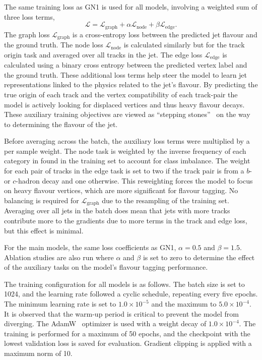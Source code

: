 The same training loss as \Gls{GN1} is used for all models, involving a weighted sum of three loss terms,
\begin{equation}
    \mathcal{L} = \mathcal{L}_{\text{graph}} + \alpha \mathcal{L}_{\text{node}} + \beta \mathcal{L}_{\text{edge}}.
\end{equation}
The graph loss $\mathcal{L}_{\text{graph}}$ is a cross-entropy loss between the predicted jet flavour and the ground truth.
The node loss $\mathcal{L}_{\text{node}}$ is calculated similarly but for the track origin task and averaged over all tracks in the jet.
The edge loss $\mathcal{L}_{\text{edge}}$ is calculated using a binary cross entropy between the predicted vertex label and the ground truth.
These additional loss terms help steer the model to learn jet representations linked to the physics related to the jet's flavour.
By predicting the true origin of each track and the vertex compatibility of each track-pair the model is actively looking for displaced vertices and thus heavy flavour decays.
These auxiliary training objectives are viewed as ``stepping stones''~\cite{GN1} on the way to determining the flavour of the jet.

Before averaging across the batch, the auxiliary loss terms were multiplied by a per sample weight.
The node task is weighted by the inverse frequency of each category in  found in the training set to account for class imbalance.
The weight for each pair of tracks in the edge task is set to two if the track pair is from a $b$- or $c$-hadron decay and one otherwise.
This reweighting forces the model to focus on heavy flavour vertices, which are more significant for flavour tagging.
No balancing is required for $\mathcal{L}_{\text{graph}}$ due to the resampling of the training set.
Averaging over all jets in the batch does mean that jets with more tracks contribute more to the gradients due to more terms in the track and edge loss, but this effect is minimal.

For the main models, the same loss coefficients as \Gls{GN1}, $\alpha = 0.5$ and $\beta = 1.5$.
Ablation studies are also run where $\alpha$ and $\beta$ is set to zero to determine the effect of the auxiliary tasks on the model's flavour tagging performance.

The training configuration for all models is as follows.
The batch size is set to 1024, and the learning rate followed a cyclic schedule, repeating every five epochs.
The minimum learning rate is set to $1.0 \times 10^{-5}$ and the maximum to $5.0 \times 10^{-4}$.
It is observed that the warm-up period is critical to prevent the model from diverging.
The AdamW~\cite{AdamW} optimizer is used with a weight decay of $1.0 \times 10^{-4}$.
The training is performed for a maximum of 50 epochs, and the checkpoint with the lowest validation loss is saved for evaluation.
Gradient clipping is applied with a maximum norm of 10.

